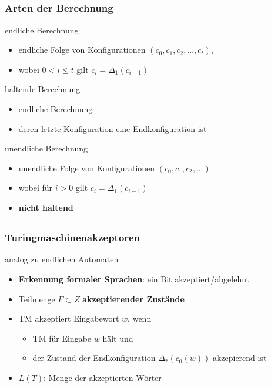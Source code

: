 \subsection*{}
\begin{frame}
  \frametitle{Arten der Berechnung}

  \pause
  \begin{block}{endliche Berechnung}
\begin{itemize}
	\item endliche Folge von Konfigurationen $(c_0, c_1, c_2, . . . , c_t )$,
	\item wobei $0 < i \leq t$ gilt  $c_i = \Delta_1(c_{i-1})$
\end{itemize}
  \end{block}

  \pause
  \begin{block}{haltende Berechnung}
\begin{itemize}
	\item endliche Berechnung
	\item deren letzte Konfiguration eine Endkonfiguration ist
\end{itemize}
  \end{block}

  \pause
  \begin{block}{unendliche Berechnung}
\begin{itemize}
	\item unendliche Folge von Konfigurationen $(c_0, c_1, c_2, . . . )$
	\item wobei für $i>0$ gilt  $c_i = \Delta_1(c_{i-1})$
	\item \textbf{nicht haltend}
\end{itemize}
  \end{block}
\end{frame}

\subsection*{}
\begin{frame}
  \frametitle{Turingmaschinenakzeptoren}
  \pause
  \begin{block}{analog zu endlichen Automaten}
\begin{itemize}
	\item   \textbf{Erkennung formaler Sprachen}: ein Bit akzeptiert/abgelehnt
	\pause
  \item		Teilmenge $F \subset Z$ \textbf{akzeptierender Zustände}
  \item		TM akzeptiert Eingabewort $w$, wenn
\begin{itemize}
	\pause
	\item TM für Eingabe $w$ hält und
	\pause
	\item der Zustand der Endkonfiguration $\Delta_{*}(c_0(w))$ akzepierend ist
\end{itemize}
\pause
\item $L(T)$: Menge der akzeptierten Wörter
\end{itemize}
\end{block}
\end{frame}

